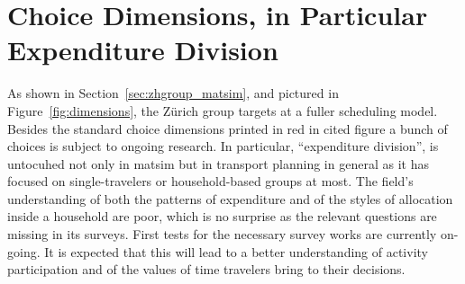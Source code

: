 %
%


\section{Choice Dimensions, in Particular Expenditure Division}
\label{sec:ra-choice-dimensions}
As shown in Section~\ref{sec:zhgroup_matsim}, and pictured in Figure~\ref{fig:dimensions}, the Zürich group targets at a fuller scheduling model. Besides the standard choice dimensions printed in red in cited figure a bunch of choices is subject to ongoing research. In particular, ``expenditure division'', is untocuhed not only in \gls{matsim} but in transport planning in general as it has focused on single-travelers or household-based groups at most. 
The field's understanding of both the patterns of expenditure and of the styles of allocation inside a household are poor, which is no surprise as the relevant questions are missing in its surveys. 
First tests for the necessary survey works are currently on-going. 
It is expected that this will lead to a better understanding of activity participation and of the values of time travelers bring to their decisions.   


